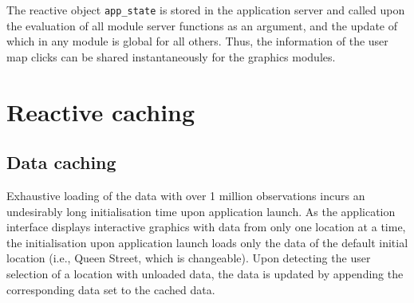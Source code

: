 \documentclass{aucklandthesis}
\begin{document}
The reactive object \texttt{app\_state} is stored in the application server and called upon the evaluation of all module server functions as an argument, and the update of which in any module is global for all others. Thus, the information of the user map clicks can be shared instantaneously for the graphics modules.

\hypertarget{reactive-caching}{%
\section{Reactive caching}\label{reactive-caching}}

\hypertarget{data-caching}{%
\subsection{Data caching}\label{data-caching}}

Exhaustive loading of the data with over 1 million observations incurs an undesirably long initialisation time upon application launch. As the application interface displays interactive graphics with data from only one location at a time, the initialisation upon application launch loads only the data of the default initial location (i.e., Queen Street, which is changeable). Upon detecting the user selection of a location with unloaded data, the data is updated by appending the corresponding data set to the cached data.
\end{document}
